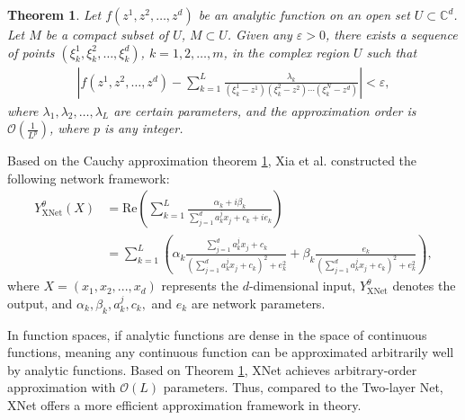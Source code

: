 \documentclass[11pt]{article}
\newtheorem{theorem}{Theorem}
\begin{document}
\begin{theorem}\label{Cauchy_approximation_theorem}
	Let $f(z^1,z^2,\dots,z^d)$ be an analytic function on an open set $U \subset \mathbb{C}^d$. Let $M$ be a compact subset of $U$, $M \subset U$. Given any $\varepsilon > 0$, there exists a sequence of points $(\xi_k^1,\xi_k^2,\dots,\xi_k^d)$, $k = 1,2,\dots,m$, in the complex region $U$ such that
	\begin{equation}\label{cauchy_th}
		\begin{aligned}
			\left|f(z^1,z^2,\dots,z^d) - \sum_{k=1}^L \frac{\lambda_k}{(\xi_k^1 - z^1)(\xi_k^2 - z^2)\cdots(\xi_k^N - z^d)}\right| < \varepsilon,
		\end{aligned}
	\end{equation}
	where $\lambda_1,\lambda_2,\dots,\lambda_L$ are certain parameters, and the approximation order is $\mathcal{O}\left(\frac{1}{L^p}\right)$, where $p$ is any integer.
	
\end{theorem}

Based on the Cauchy approximation theorem \ref{Cauchy_approximation_theorem}, Xia et al. constructed the following network framework:
\begin{equation}\label{XNet}
	\begin{aligned}
		Y_{\text{XNet}}^\theta(X) &= \text{Re}\left(\sum_{k=1}^L \frac{\alpha_k + i \beta_k}{\sum_{j=1}^d a_k^j x_j + c_k + i e_k}\right) \\
		&= \sum_{k=1}^L \left( \alpha_k \frac{\sum_{j=1}^d a_k^j x_j + c_k}{\left(\sum_{j=1}^d a_k^j x_j + c_k\right)^2 + e_k^2} + \beta_k \frac{e_k}{\left(\sum_{j=1}^d a_k^j x_j + c_k\right)^2 + e_k^2}\right),
	\end{aligned}
\end{equation}
where $X=\left(x_1,x_2,...,x_d\right)$ represents the $d$-dimensional input, $Y_{\text{XNet}}^\theta$ denotes the output, and $\alpha_k, \beta_k, a_k^j, c_k,$ and $e_k$ are network parameters.

In function spaces, if analytic functions are dense in the space of continuous functions, meaning any continuous function can be approximated arbitrarily well by analytic functions. Based on Theorem \ref{Cauchy_approximation_theorem}, XNet achieves arbitrary-order approximation with \(\mathcal{O}(L)\) parameters. Thus, compared to the Two-layer Net, XNet offers a more efficient approximation framework in theory.
\end{document}

